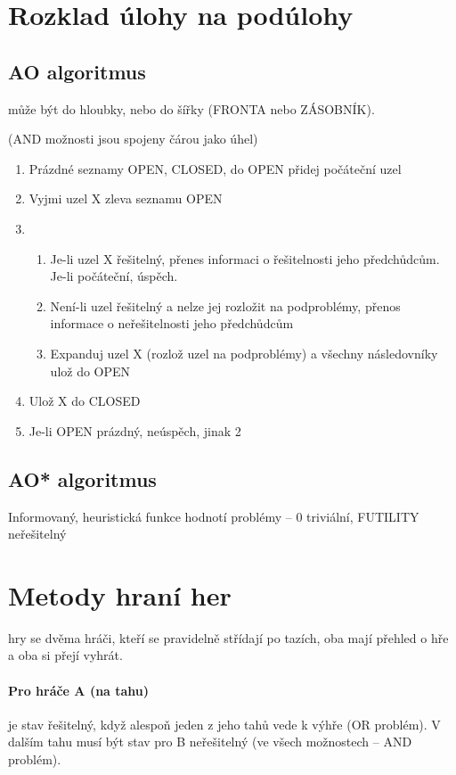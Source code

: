 \documentclass[a4wide]{report}
\begin{document}
\section{Rozklad úlohy na podúlohy}

\subsection{AO algoritmus} může být do hloubky, nebo do šířky (FRONTA nebo ZÁSOBNÍK).

(AND možnosti jsou spojeny čárou jako úhel)

\begin{enumerate}
	\item Prázdné seznamy OPEN, CLOSED, do OPEN přidej počáteční uzel
	\item Vyjmi uzel X zleva seznamu OPEN
	\item
	\begin{enumerate}
		\item Je-li uzel X řešitelný, přenes informaci o řešitelnosti jeho předchůdcům. Je-li počáteční, úspěch.
		\item Není-li uzel řešitelný a nelze jej rozložit na podproblémy, přenos informace o neřešitelnosti jeho předchůdcům
		\item Expanduj uzel X (rozlož uzel na podproblémy) a všechny následovníky ulož do OPEN
	\end{enumerate}
	\item Ulož X do CLOSED
	\item Je-li OPEN prázdný, neúspěch, jinak 2
\end{enumerate}

\subsection{AO* algoritmus}
Informovaný, heuristická funkce hodnotí problémy -- 0 triviální, FUTILITY neřešitelný

\section{Metody hraní her}

hry se dvěma hráči, kteří se pravidelně střídají po tazích, oba mají přehled o hře a oba si přejí vyhrát.

\paragraph{Pro hráče A (na tahu)} je stav řešitelný, když alespoň jeden z jeho tahů vede k výhře (OR problém). V dalším tahu musí být stav pro B neřešitelný (ve všech možnostech -- AND problém).
\end{document}
